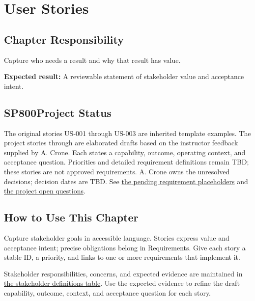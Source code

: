 \chapter{User Stories}
\section{Chapter Responsibility}
\label{Section:UserStoriesResponsibility}
Capture who needs a result and why that result has value.

\noindent\textbf{Expected result:} A reviewable statement of stakeholder value and acceptance intent.

\section{SP800Project Status}
\label{Section:SP800StatusUserStories}
The original stories US-001 through US-003 are inherited template examples.
The project stories  through 
are elaborated drafts based on the instructor feedback supplied by A. Crone.
Each states a capability, outcome, operating context, and acceptance question.
Priorities and detailed requirement definitions remain TBD; these stories
are not approved requirements. A. Crone owns the unresolved decisions;
decision dates are TBD.
See \hyperref[Section:PendingStoryRequirements]{the pending requirement
placeholders} and \hyperref[Section:SP800OpenQuestions]{the project open questions}.

\section{How to Use This Chapter}
Capture stakeholder goals in accessible language. Stories express value and
acceptance intent; precise obligations belong in Requirements. Give each story
a stable ID, a priority, and links to one or more requirements that implement it.

Stakeholder responsibilities, concerns, and expected evidence are maintained in
\hyperref[Table:StakeholderDefinitions]{the stakeholder definitions table}.
Use the expected evidence to refine the draft capability, outcome, context,
and acceptance question for each story.

